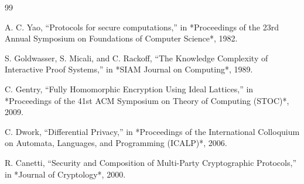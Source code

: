 \documentclass[conference]{IEEEtran}
\begin{document}
\begin{thebibliography}{99}

A. C. Yao, ``Protocols for secure computations,'' in *Proceedings of the 23rd Annual Symposium on Foundations of Computer Science*, 1982.

S. Goldwasser, S. Micali, and C. Rackoff, ``The Knowledge Complexity of Interactive Proof Systems,'' in *SIAM Journal on Computing*, 1989.

C. Gentry, ``Fully Homomorphic Encryption Using Ideal Lattices,'' in *Proceedings of the 41st ACM Symposium on Theory of Computing (STOC)*, 2009.

C. Dwork, ``Differential Privacy,'' in *Proceedings of the International Colloquium on Automata, Languages, and Programming (ICALP)*, 2006.

R. Canetti, ``Security and Composition of Multi-Party Cryptographic Protocols,'' in *Journal of Cryptology*, 2000.

\end{thebibliography}



\end{document}
